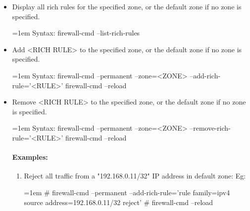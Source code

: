 
\begin{flushleft}
	
	\begin{itemize}
		\item Display all rich rules for the specified zone, or the default zone if no zone is specified.
		\bigskip
		\begin{tcolorbox}[breakable,notitle,boxrule=0pt,colback=pink,colframe=pink]
			\color{black}
			\font=1em
			Syntax: 
			\newline
			firewall-cmd --list-rich-rules
			\font=4pt
		\end{tcolorbox}

		\bigskip
		\bigskip
		\item Add <RICH RULE> to the specified zone, or the default zone if no zone is specified.
		\bigskip
		\begin{tcolorbox}[breakable,notitle,boxrule=0pt,colback=pink,colframe=pink]
			\color{black}
			\font=1em
			Syntax: 
			\newline
			firewall-cmd --permanent --zone=<ZONE> --add-rich-rule='<RULE>'
			\newline
			firewall-cmd --reload
			\font=4pt
		\end{tcolorbox}
	
		\bigskip
		\bigskip
		\item Remove <RICH RULE> to the specified zone, or the default zone if no zone is specified.
		\bigskip
		\begin{tcolorbox}[breakable,notitle,boxrule=0pt,colback=pink,colframe=pink]
			\color{black}
			\font=1em
			Syntax: 
			\newline
			firewall-cmd --permanent --zone=<ZONE> --remove-rich-rule='<RULE>'
			\newline
			firewall-cmd --reload
			\font=4pt
		\end{tcolorbox}
	
	\newpage
	
	\paragraph{Examples:}
	\bigskip
	\begin{enumerate}
		\item Reject all traffic from a "192.168.0.11/32" IP address in default zone:
		\newline
		Eg:
		\begin{tcolorbox}[breakable,notitle,boxrule=-0pt,colback=black,colframe=black]
			\color{green}
			\font=1em
			\# firewall-cmd --permanent --add-rich-rule='rule family=ipv4 source address=192.168.0.11/32 reject'
			\newline
			\newline
			\# firewall-cmd --reload
			\font=4pt
		\end{tcolorbox}
		

\end{enumerate}
\end{itemize}
\end{flushleft}
